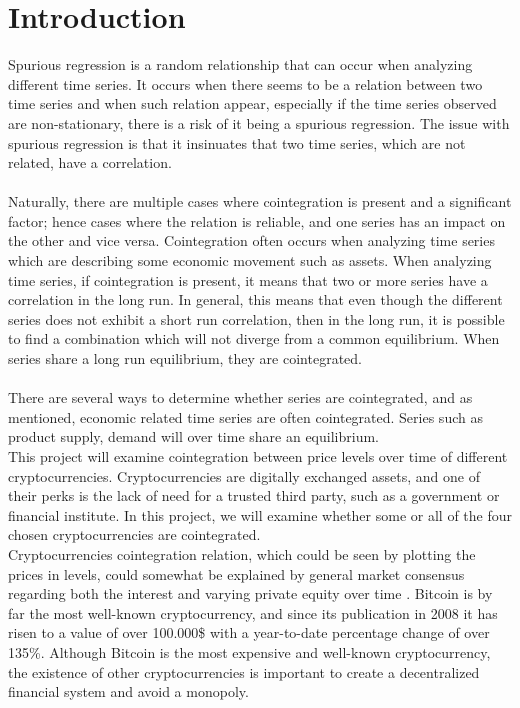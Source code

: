 \chapter{Introduction}
Spurious regression is a random relationship that can occur when analyzing different time series. It occurs when there seems to be a relation between two time series and when such relation appear, especially if the time series observed are non-stationary, there is a risk of it being a spurious regression. The issue with spurious regression is that it insinuates that two time series, which are not related, have a correlation.\\\\
\noindent Naturally, there are multiple cases where cointegration is present and a significant factor; hence cases where the relation is reliable, and one series has an impact on the other and vice versa. Cointegration often occurs when analyzing time series which are describing some economic movement such as assets. When analyzing time series, if cointegration is present, it means that two or more series have a correlation in the long run. In general, this means that even though the different series does not exhibit a short run correlation, then in the long run, it is possible to find a combination which will not diverge from a common equilibrium. When series share a long run equilibrium, they are cointegrated\cite{Intro_cointegration}.\\\\
There are several ways to determine whether series are cointegrated, and as mentioned, economic related time series are often cointegrated. Series such as product supply, demand will over time share an equilibrium.\\
This project will examine cointegration between price levels over time of different cryptocurrencies. Cryptocurrencies are digitally exchanged assets, and one of their perks is the lack of need for a trusted third party, such as a government or financial institute. In this project, we will examine whether some or all of the four chosen cryptocurrencies are cointegrated.\\
Cryptocurrencies cointegration relation, which could be seen by plotting the prices in levels, could somewhat be explained by general market consensus regarding both the interest and varying private equity over time \cite{Coinmarket}. 
Bitcoin is by far the most well-known cryptocurrency, and since its publication in 2008 it has risen to a value of over 100.000\$ with a year-to-date percentage change of over 135\%. Although Bitcoin is the most expensive and well-known cryptocurrency, the existence of other cryptocurrencies is important to create a decentralized financial system and avoid a monopoly.\\
